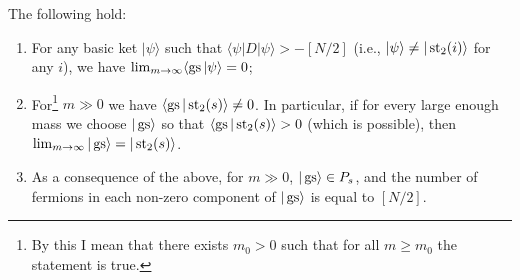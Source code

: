 \begin{lemma} \label{l:gs_conv_pos}
The following hold:
\begin{enumerate}
\item For any basic ket $|\psi\rangle$ such that $\langle \psi |D|\psi\rangle > -[N/2]$ (i.e., $|\psi\rangle \neq |\operatorname{st}_2(i)\rangle$ for any $i$), we have $\lim_{m \rightarrow \infty} \langle \operatorname{gs} | \psi \rangle = 0$;
\item For\footnote{By this I mean that there exists $m_0 > 0$ such that for all $m \geq m_0$ the statement is true.} $m \gg 0$ we have $\left\langle \operatorname{gs} | \operatorname{st}_2(s) \right\rangle \neq 0$. In particular, if for every large enough mass we choose $|\operatorname{gs}\rangle$ so that $\langle \operatorname{gs} | \operatorname{st}_2(s) \rangle > 0$ (which is possible), then $\lim_{m \rightarrow \infty} |\operatorname{gs}\rangle = |\operatorname{st}_2(s)\rangle$. 
\item As a consequence of the above, for $m \gg 0$, $|\operatorname{gs}\rangle \in P_s$, and the number of fermions in each non-zero component of $|\operatorname{gs}\rangle$ is equal to $[N/2]$.
\end{enumerate}
\end{lemma}
